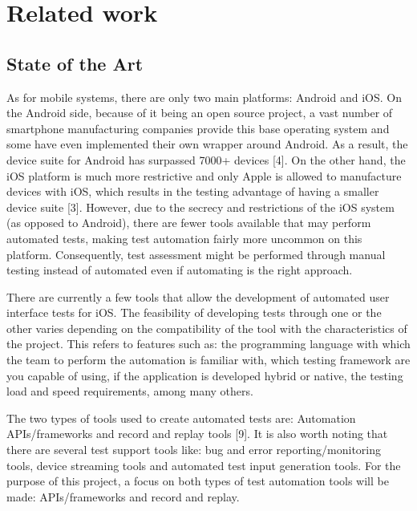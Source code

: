 %
\chapter{Related work}
\label{chapter2}

\section{State of the Art}

As for mobile systems, there are only two main platforms: Android and iOS. On the Android side, because of it being an open source project, a vast number of smartphone manufacturing companies provide this base operating system and some have even implemented their own wrapper around Android. As a result, the device suite for Android has surpassed 7000+ devices [4]. On the other hand, the iOS platform is much more restrictive and only Apple is allowed to manufacture devices with iOS, which results in the testing advantage of having a smaller device suite [3]. However, due to the secrecy and restrictions of the iOS system (as opposed to Android), there are fewer tools available that may perform automated tests, making test automation fairly more uncommon on this platform. Consequently, test assessment might be performed through manual testing instead of automated even if automating is the right approach.

There are currently a few tools that allow the development of automated user interface tests for iOS. The feasibility of developing tests through one or the other varies depending on the compatibility of the tool with the characteristics of the project. This refers to features such as: the programming language with which the team to perform the automation is familiar with, which testing framework are you capable of using, if the application is developed hybrid or native, the testing load and speed requirements, among many others.

The two types of tools used to create automated tests are: Automation APIs/frameworks and record and replay tools [9]. It is also worth noting that there are several test support tools like: bug and error reporting/monitoring tools, device streaming tools and automated test input generation tools. For the purpose of this project, a focus on both types of test automation tools will be made: APIs/frameworks and record and replay.

